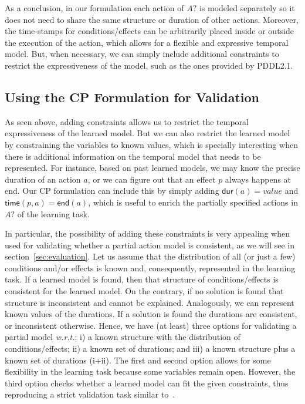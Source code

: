 \documentclass[runningheads]{llncs}
\newcommand{\dur}{\mathsf{dur}}    %
\newcommand{\en}{\mathsf{end}}     %
\newcommand{\tim}{\mathsf{time}}   %
\begin{document}
As a conclusion, in our formulation each action of $A?$ is modeled separately so it does not need to share the same structure or duration of other actions. Moreover, the time-stamps for conditions/effects can be arbitrarily placed inside or outside the execution of the action, which allows for a flexible and expressive temporal model. But, when necessary, we can simply include additional constraints to restrict the expressiveness of the model, such as the ones provided by PDDL2.1.


\subsection{Using the CP Formulation for Validation}
\label{sec:usingCPValidation}

As seen above, adding constraints allows us to restrict the temporal expressiveness of the learned model.
But we can also restrict the learned model by constraining the variables to known values, which is specially interesting when there is additional information on the temporal model that needs to be represented. For instance, based on past learned models, we may know the precise duration of an action $a$,
or we can figure out that an effect $p$ always happens at end.
Our CP formulation can include this by simply adding $\dur(a)=value$ and $\tim(p,a)=\en(a)$, which is useful to enrich the partially specified actions in $A?$ of the learning task.


In particular, the possibility of adding these constraints is very appealing when used for validating whether a partial action model is consistent, as we will see in section~\ref{sec:evaluation}.
Let us assume that the distribution of all (or just a few) conditions and/or effects is known and, consequently, represented in the learning task. If a learned model is found, then that structure of conditions/effects is consistent for the learned model. On the contrary, if no solution is found that structure is inconsistent and cannot be explained.
Analogously, we can represent known values of the durations. If a solution is found the durations are consistent, or inconsistent otherwise.
Hence, we have (at least) three options for validating a partial model \emph{w.r.t.}: i) a known structure with the distribution of conditions/effects; ii) a known set of durations; and iii) a known structure plus a known set of durations (i+ii).
The first and second option allows for some flexibility in the learning task because some variables remain open. However, the third option checks whether a learned model can fit the given constraints, thus reproducing a strict validation task similar to~\cite{howey2004val}.
\end{document}
